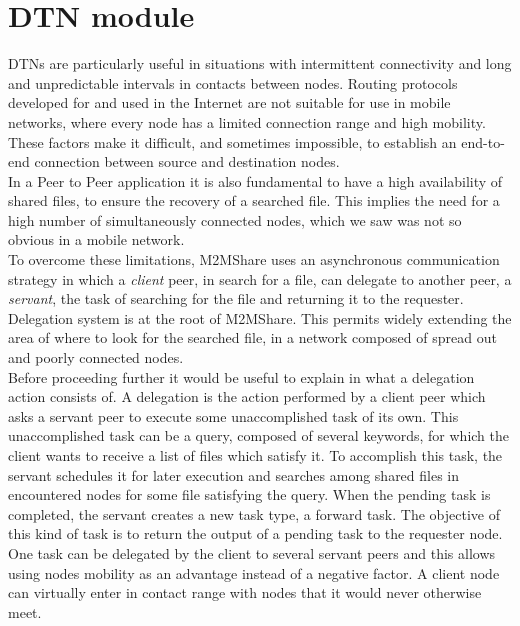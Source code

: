 %

\section{DTN module}
DTNs are particularly useful in situations with intermittent connectivity and long and unpredictable intervals in contacts between nodes. Routing protocols developed for and used in the Internet are not suitable for use in mobile networks, where every node has a limited connection range and high mobility. These factors make it difficult, and sometimes impossible, to establish an end-to-end connection between source and destination nodes.
\\

In a Peer to Peer application it is also fundamental to have a high availability of shared files, to ensure the recovery of a searched file. This implies the need for a high number of simultaneously connected nodes, which we saw was not so obvious in a mobile network.
\\

To overcome these limitations, M2MShare uses an asynchronous communication strategy in which a \textit{client} peer, in search for a file, can delegate to another peer, a \textit{servant}, the task of searching for the file and returning it to the requester. Delegation system is at the root of M2MShare. This permits widely extending the area of where to look for the searched file, in a network composed of spread out and poorly connected nodes.
\\

Before proceeding further it would be useful to explain in what a delegation action consists of. A delegation is the action performed by a client peer which asks a servant peer to execute some unaccomplished task of its own. This unaccomplished task can be a query, composed of several keywords, for which the client wants to receive a list of files which satisfy it. To accomplish this task, the servant schedules it for later execution and searches among shared files in encountered nodes for some file satisfying the query. When the pending task is completed, the servant creates a new task type, a forward task. The objective of this kind of task is to return the output of a pending task to the requester node. 
\\
One task can be delegated by the client to several servant peers and this allows using nodes mobility as an advantage instead of a negative factor. A client node can virtually enter in contact range with nodes that it would never otherwise meet.

